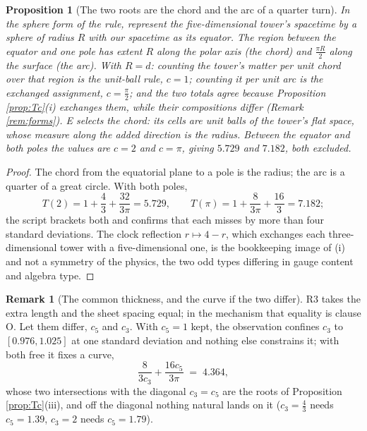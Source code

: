 \documentclass[11pt]{article}
\newtheorem{proposition}[theorem]{Proposition}
\theoremstyle{definition}
\newtheorem{remark}[theorem]{Remark}
\begin{document}
\begin{proposition}[The two roots are the chord and the arc of a quarter turn]\label{prop:pole}
In the sphere form of the rule, represent the five-dimensional tower's spacetime by a sphere of radius $R$ with our spacetime as its equator. The region between the equator and one pole has extent $R$ along the polar axis (the chord) and $\tfrac{\pi R}{2}$ along the surface (the arc). With $R = d$: counting the tower's matter per unit chord over that region is the unit-ball rule, $c = 1$; counting it per unit arc is the exchanged assignment, $c = \tfrac{\pi}{2}$; and the two totals agree because Proposition \ref{prop:Tc}(i) exchanges them, while their compositions differ (Remark \ref{rem:forms}). E selects the chord: its cells are unit balls of the tower's flat space, whose measure along the added direction is the radius. Between the equator and both poles the values are $c = 2$ and $c = \pi$, giving $5.729$ and $7.182$, both excluded.
\end{proposition}

\begin{proof}
The chord from the equatorial plane to a pole is the radius; the arc is a quarter of a great circle. With both poles,
\[
T(2) = 1 + \frac{4}{3} + \frac{32}{3\pi} = 5.729, \qquad T(\pi) = 1 + \frac{8}{3\pi} + \frac{16}{3} = 7.182 ;
\]
the script brackets both and confirms that each misses by more than four standard deviations. The clock reflection $r \mapsto 4 - r$, which exchanges each three-dimensional tower with a five-dimensional one, is the bookkeeping image of (i) and not a symmetry of the physics, the two odd types differing in gauge content and algebra type.
\end{proof}

\begin{remark}[The common thickness, and the curve if the two differ]\label{rem:twoc}
R3 takes the extra length and the sheet spacing equal; in the mechanism that equality is clause O. Let them differ, $c_{5}$ and $c_{3}$. With $c_{5} = 1$ kept, the observation confines $c_{3}$ to $[0.976, 1.025]$ at one standard deviation and nothing else constrains it; with both free it fixes a curve,
\[
\frac{8}{3c_{3}} + \frac{16c_{5}}{3\pi} \;=\; 4.364,
\]
whose two intersections with the diagonal $c_{3} = c_{5}$ are the roots of Proposition \ref{prop:Tc}(iii), and off the diagonal nothing natural lands on it ($c_{3} = \tfrac{4}{3}$ needs $c_{5} = 1.39$, $c_{3} = 2$ needs $c_{5} = 1.79$).
\end{remark}
\end{document}
